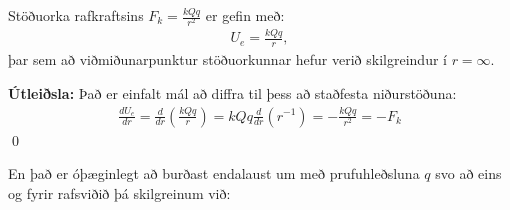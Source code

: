 \newpage

\begin{tcolorbox}
\begin{theorem}
Stöðuorka rafkraftsins $F_k = \frac{kQq}{r^2}$ er gefin með:
\begin{align*}
    U_e = \frac{kQq}{r},
\end{align*}
þar sem að viðmiðunarpunktur stöðuorkunnar hefur verið skilgreindur í $r = \infty$.
\end{theorem}
\end{tcolorbox}

\textbf{Útleiðsla:} Það er einfalt mál að diffra til þess að staðfesta niðurstöðuna:
\begin{align*}
    \frac{dU_e}{dr} = \frac{d}{dr}\left( \frac{kQq}{r} \right) = kQq\frac{d}{dr}\left( r^{-1} \right) = -\frac{kQq}{r^2} = -F_k
\end{align*}
\qed

En það er óþæginlegt að burðast endalaust um með prufuhleðsluna $q$ svo að eins og fyrir rafsviðið þá skilgreinum við:

